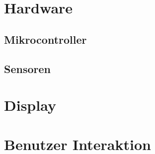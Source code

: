 \begin{inhalt}
\renewcommand*\chapterpagestyle{scrheadings}
\section{Hardware}
\subsection{Mikrocontroller}
\subsection{Sensoren}
\section{Display}
\section{Benutzer Interaktion}

\end{inhalt}
